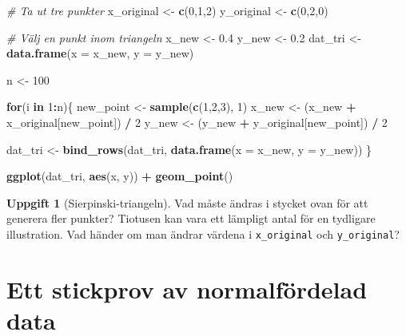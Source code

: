 \documentclass[
]{book}
\newenvironment{Shaded}{\begin{snugshade}}{\end{snugshade}}
\newcommand{\AttributeTok}[1]{\textcolor[rgb]{0.13,0.29,0.53}{#1}}
\newcommand{\CommentTok}[1]{\textcolor[rgb]{0.56,0.35,0.01}{\textit{#1}}}
\newcommand{\ControlFlowTok}[1]{\textcolor[rgb]{0.13,0.29,0.53}{\textbf{#1}}}
\newcommand{\DecValTok}[1]{\textcolor[rgb]{0.00,0.00,0.81}{#1}}
\newcommand{\FloatTok}[1]{\textcolor[rgb]{0.00,0.00,0.81}{#1}}
\newcommand{\FunctionTok}[1]{\textcolor[rgb]{0.13,0.29,0.53}{\textbf{#1}}}
\newcommand{\NormalTok}[1]{#1}
\newcommand{\OtherTok}[1]{\textcolor[rgb]{0.56,0.35,0.01}{#1}}
\newcommand{\SpecialCharTok}[1]{\textcolor[rgb]{0.81,0.36,0.00}{\textbf{#1}}}
\theoremstyle{definition}
\theoremstyle{definition}
\theoremstyle{definition}
\newtheorem{exercise}{Uppgift}[chapter]
\theoremstyle{definition}
\theoremstyle{remark}
\begin{document}
\begin{Shaded}
\begin{Highlighting}[]
\CommentTok{\# Ta ut tre punkter}
\NormalTok{x\_original }\OtherTok{\textless{}{-}} \FunctionTok{c}\NormalTok{(}\DecValTok{0}\NormalTok{,}\DecValTok{1}\NormalTok{,}\DecValTok{2}\NormalTok{)}
\NormalTok{y\_original }\OtherTok{\textless{}{-}} \FunctionTok{c}\NormalTok{(}\DecValTok{0}\NormalTok{,}\DecValTok{2}\NormalTok{,}\DecValTok{0}\NormalTok{)}

\CommentTok{\# Välj en punkt inom triangeln}
\NormalTok{x\_new }\OtherTok{\textless{}{-}} \FloatTok{0.4}
\NormalTok{y\_new }\OtherTok{\textless{}{-}} \FloatTok{0.2}
\NormalTok{dat\_tri }\OtherTok{\textless{}{-}} \FunctionTok{data.frame}\NormalTok{(}\AttributeTok{x =}\NormalTok{ x\_new, }\AttributeTok{y =}\NormalTok{ y\_new)}

\NormalTok{n }\OtherTok{\textless{}{-}} \DecValTok{100}

\ControlFlowTok{for}\NormalTok{(i }\ControlFlowTok{in} \DecValTok{1}\SpecialCharTok{:}\NormalTok{n)\{}
\NormalTok{  new\_point }\OtherTok{\textless{}{-}} \FunctionTok{sample}\NormalTok{(}\FunctionTok{c}\NormalTok{(}\DecValTok{1}\NormalTok{,}\DecValTok{2}\NormalTok{,}\DecValTok{3}\NormalTok{), }\DecValTok{1}\NormalTok{)}
\NormalTok{  x\_new }\OtherTok{\textless{}{-}}\NormalTok{ (x\_new }\SpecialCharTok{+}\NormalTok{ x\_original[new\_point]) }\SpecialCharTok{/} \DecValTok{2}
\NormalTok{  y\_new }\OtherTok{\textless{}{-}}\NormalTok{ (y\_new }\SpecialCharTok{+}\NormalTok{ y\_original[new\_point]) }\SpecialCharTok{/} \DecValTok{2}
  
\NormalTok{  dat\_tri }\OtherTok{\textless{}{-}} \FunctionTok{bind\_rows}\NormalTok{(dat\_tri, }\FunctionTok{data.frame}\NormalTok{(}\AttributeTok{x =}\NormalTok{ x\_new, }\AttributeTok{y =}\NormalTok{ y\_new))}
\NormalTok{\}}

\FunctionTok{ggplot}\NormalTok{(dat\_tri, }\FunctionTok{aes}\NormalTok{(x, y)) }\SpecialCharTok{+}
  \FunctionTok{geom\_point}\NormalTok{()}
\end{Highlighting}
\end{Shaded}

\begin{exercise}[Sierpinski-triangeln]
Vad måste ändras i stycket ovan för att generera fler punkter? Tiotusen kan vara ett lämpligt antal för en tydligare illustration. Vad händer om man ändrar värdena i \texttt{x\_original} och \texttt{y\_original}?
\end{exercise}

\hypertarget{ett-stickprov-av-normalfuxf6rdelad-data}{%
\chapter{Ett stickprov av normalfördelad data}\label{ett-stickprov-av-normalfuxf6rdelad-data}}
\end{document}
